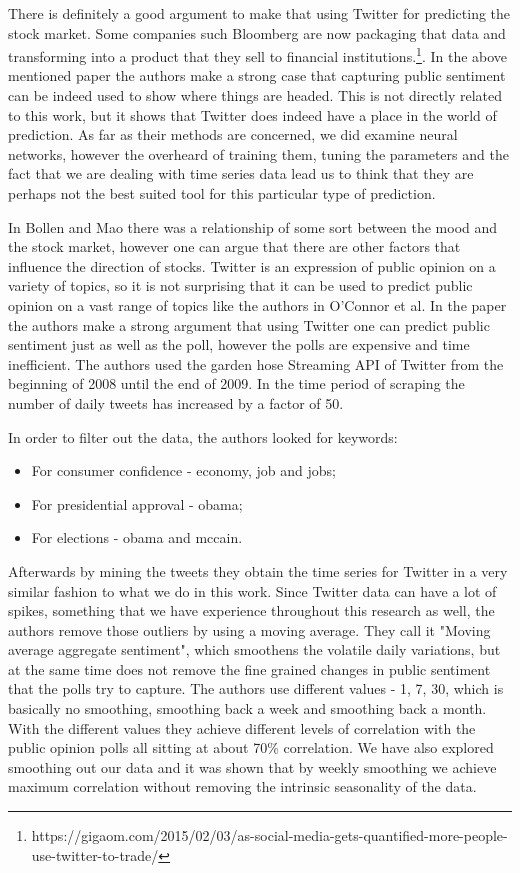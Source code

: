 \documentclass[minf,twoside,singlespacing,parskip,frontabs,notimes,12pt]{infthesis} %
\begin{document}
There is definitely a good argument to make that using Twitter for predicting the stock market. Some companies such Bloomberg are now packaging that data and transforming into a product that they sell to financial institutions.\footnote{https://gigaom.com/2015/02/03/as-social-media-gets-quantified-more-people-use-twitter-to-trade/}. In the above mentioned paper the authors make a strong case that capturing public sentiment can be indeed used to show where things are headed. This is not directly related to this work, but it shows that Twitter does indeed have a place in the world of prediction. As far as their methods are concerned, we did examine neural networks, however the overheard of training them, tuning the parameters and the fact that we are dealing with time series data lead us to think that they are perhaps not the best suited tool for this particular type of prediction. 

In Bollen and Mao\cite{twitstock} there was a relationship of some sort between the mood and the stock market, however one can argue that there are other factors that influence the direction of stocks. Twitter is an expression of public opinion on a variety of topics, so it is not surprising that it can be used to predict public opinion on a vast range of topics like the authors in O'Connor et al\cite{twitpoll}. In the paper the authors make a strong argument that using Twitter one can predict public sentiment just as well as the poll, however the polls are expensive and time inefficient. The authors used the garden hose Streaming API of Twitter from the beginning of 2008 until the end of 2009. In the time period of scraping the number of daily tweets has increased by a factor of 50. 

In order to filter out the data, the authors looked for keywords:
\begin{itemize}	
\item For consumer confidence - economy, job and jobs;
\item For presidential approval - obama;
\item For elections - obama and mccain.
\end{itemize}

Afterwards by mining the tweets they obtain the time series for Twitter in a very similar fashion to what we do in this work. Since Twitter data can have a lot of spikes, something that we have experience throughout this research as well, the authors remove those outliers by using a moving average. They call it "Moving average aggregate sentiment", which smoothens the volatile daily variations, but at the same time does not remove the fine grained changes in public sentiment that the polls try to capture. The authors use different values - 1, 7, 30, which is basically no smoothing, smoothing back a week and smoothing back a month. With the different values they achieve different levels of correlation with the public opinion polls all sitting at about 70\% correlation. We have also explored smoothing out our data and it was shown that by weekly smoothing we achieve maximum correlation without removing the intrinsic seasonality of the data.
\end{document}
